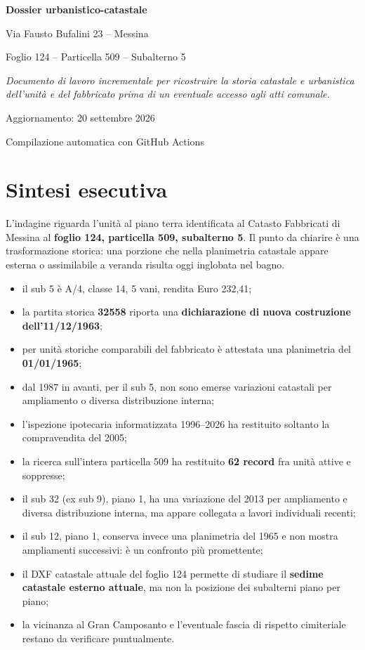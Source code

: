 \documentclass[11pt,a4paper]{article}
\begin{document}
\begin{titlepage}\centering\vspace*{2cm}
{\Huge\bfseries Dossier urbanistico-catastale\par}\vspace{.5cm}
{\LARGE Via Fausto Bufalini 23 -- Messina\par}\vspace{.8cm}
{\large Foglio 124 -- Particella 509 -- Subalterno 5\par}
\vfill
\begin{minipage}{.82\textwidth}\centering\itshape
Documento di lavoro incrementale per ricostruire la storia catastale e urbanistica dell'unità e del fabbricato prima di un eventuale accesso agli atti comunale.
\end{minipage}
\vfill {\large Aggiornamento: 20 settembre 2026\par}
{\small Compilazione automatica con GitHub Actions}
\end{titlepage}
\tableofcontents\newpage

\section{Sintesi esecutiva}
L'indagine riguarda l'unità al piano terra identificata al Catasto Fabbricati di Messina al \textbf{foglio 124, particella 509, subalterno 5}. Il punto da chiarire è una trasformazione storica: una porzione che nella planimetria catastale appare esterna o assimilabile a veranda risulta oggi inglobata nel bagno.

\begin{itemize}[leftmargin=*]
\item il sub 5 è A/4, classe 14, 5 vani, rendita Euro 232,41;
\item la partita storica \textbf{32558} riporta una \textbf{dichiarazione di nuova costruzione dell'11/12/1963};
\item per unità storiche comparabili del fabbricato è attestata una planimetria del \textbf{01/01/1965};
\item dal 1987 in avanti, per il sub 5, non sono emerse variazioni catastali per ampliamento o diversa distribuzione interna;
\item l'ispezione ipotecaria informatizzata 1996--2026 ha restituito soltanto la compravendita del 2005;
\item la ricerca sull'intera particella 509 ha restituito \textbf{62 record} fra unità attive e soppresse;
\item il sub 32 (ex sub 9), piano 1, ha una variazione del 2013 per ampliamento e diversa distribuzione interna, ma appare collegata a lavori individuali recenti;
\item il sub 12, piano 1, conserva invece una planimetria del 1965 e non mostra ampliamenti successivi: è un confronto più promettente;
\item il DXF catastale attuale del foglio 124 permette di studiare il \textbf{sedime catastale esterno attuale}, ma non la posizione dei subalterni piano per piano;
\item la vicinanza al Gran Camposanto e l'eventuale fascia di rispetto cimiteriale restano da verificare puntualmente.
\end{itemize}
\end{document}
